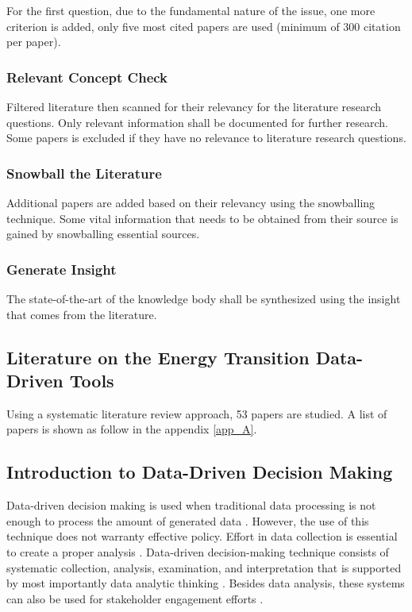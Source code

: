 For the first question, due to the fundamental nature of the issue, one more criterion is added, only five most cited papers are used (minimum of 300 citation per paper).  

\subsubsection{Relevant Concept Check}
Filtered literature then scanned for their relevancy for the literature research questions. Only relevant information shall be documented for further research. Some papers is excluded if they have no relevance to literature research questions. 

\subsubsection{Snowball the Literature}
Additional papers are added based on their relevancy using the snowballing technique. Some vital information that needs to be obtained from their source is gained by snowballing essential sources. 

\subsubsection{Generate Insight}
The state-of-the-art of the knowledge body shall be synthesized using the insight that comes from the literature.

\newpage
\subsection{Literature on the Energy Transition Data-Driven Tools}
Using a systematic literature review approach, 53 papers are studied. A list of papers is shown as follow in the appendix \ref{app_A}.

\subsection{Introduction to Data-Driven Decision Making}

Data-driven decision making is used when traditional data processing is not enough to process the amount of generated data \citep{Provost2013DataMaking}. However, the use of this technique does not warranty effective policy\citep{Marsh200MakingEducation, Wohlstetter2008CreatingFramework}. Effort in data collection is essential to create a proper analysis \citep{Provost2013DataMaking, Marsh200MakingEducation}. Data-driven decision-making technique consists of systematic collection, analysis, examination, and interpretation \citep{Mandinach2012APractice} that is supported by most importantly data analytic thinking \citep{Provost2013DataMaking}. Besides data analysis, these systems can also be used for stakeholder engagement efforts \citep{Janssen2018InnovatingPrepared, Wayman2005InvolvingReflection}.   

